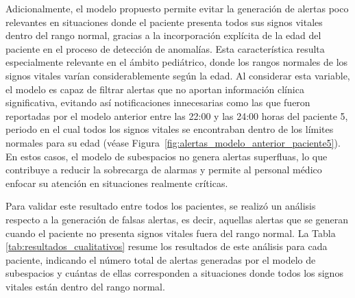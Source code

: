 Adicionalmente, el modelo propuesto permite evitar la generación de alertas poco relevantes en situaciones donde el paciente presenta todos sus signos vitales dentro del rango normal, gracias a la incorporación explícita de la edad del paciente en el proceso de detección de anomalías. Esta característica resulta especialmente relevante en el ámbito pediátrico, donde los rangos normales de los signos vitales varían considerablemente según la edad. Al considerar esta variable, el modelo es capaz de filtrar alertas que no aportan información clínica significativa, evitando así notificaciones innecesarias como las que fueron reportadas por el modelo anterior entre las 22:00 y las 24:00 horas del paciente 5, periodo en el cual todos los signos vitales se encontraban dentro de los límites normales para su edad (véase Figura~\ref{fig:alertas_modelo_anterior_paciente5}). En estos casos, el modelo de subespacios no genera alertas superfluas, lo que contribuye a reducir la sobrecarga de alarmas y permite al personal médico enfocar su atención en situaciones realmente críticas.

Para validar este resultado entre todos los pacientes, se realizó un análisis respecto a la generación de falsas alertas, es decir, aquellas alertas que se generan cuando el paciente no presenta signos vitales fuera del rango normal. La Tabla \ref{tab:resultados_cualitativos} resume los resultados de este análisis para cada paciente, indicando el número total de alertas generadas por el modelo de subespacios y cuántas de ellas corresponden a situaciones donde todos los signos vitales están dentro del rango normal.

